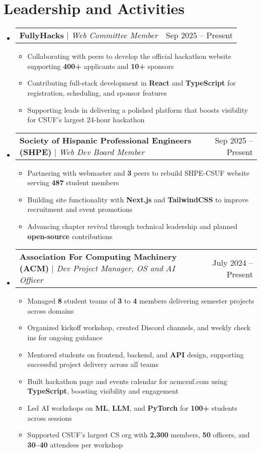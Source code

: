 \documentclass[letterpaper,11pt]{article}
\makeatletter
\newcommand{\resumeItem}[1]{
  \item\small{
    {#1 \vspace{-2pt}}
  }
}
\newcommand{\resumeProjectHeading}[2]{
    \item
    \begin{tabular*}{0.97\textwidth}{l@{\extracolsep{\fill}}r}
      \small#1 & #2 \\
    \end{tabular*}\vspace{-7pt}
}
\newcommand{\resumeSubHeadingListStart}{\begin{itemize}[leftmargin=0.15in, label={}]}
\newcommand{\resumeSubHeadingListEnd}{\end{itemize}}
\newcommand{\resumeItemListStart}{\begin{itemize}}
\newcommand{\resumeItemListEnd}{\end{itemize}\vspace{-5pt}}
\makeatother
\begin{document}
\section{Leadership and Activities}
    \resumeSubHeadingListStart
        \resumeProjectHeading
          {\textbf{FullyHacks} $|$ \emph{Web Committee Member}}{Sep 2025 -- Present}
          \resumeItemListStart
            \resumeItem{Collaborating with peers to develop the official hackathon website supporting \textbf{400+} applicants and \textbf{10+} sponsors}
            \resumeItem{Contributing full-stack development in \textbf{React} and \textbf{TypeScript} for registration, scheduling, and sponsor features}
            \resumeItem{Supporting leads in delivering a polished platform that boosts visibility for CSUF’s largest 24-hour hackathon}
          \resumeItemListEnd
    \resumeProjectHeading
          {\textbf{Society of Hispanic Professional Engineers (SHPE)} $|$ \emph{Web Dev Board Member}}{Sep 2025 -- Present}
          \resumeItemListStart
            \resumeItem{Partnering with webmaster and \textbf{3} peers to rebuild SHPE-CSUF website serving \textbf{487} student members}
            \resumeItem{Building site functionality with \textbf{Next.js} and \textbf{TailwindCSS} to improve recruitment and event promotions}
            \resumeItem{Advancing chapter revival through technical leadership and planned \textbf{open-source} contributions}
          \resumeItemListEnd
          \resumeProjectHeading
          {\textbf{Association For Computing Machinery (ACM)} $|$ \emph{Dev Project Manager, OS and AI Officer}}{July 2024 -- Present}
          \resumeItemListStart
            \resumeItem{Managed \textbf{8} student teams of \textbf{3} to \textbf{4} members delivering semester projects across domains}
            \resumeItem{Organized kickoff workshop, created Discord channels, and weekly check ins for ongoing guidance}
            \resumeItem{Mentored students on frontend, backend, and \textbf{API} design, supporting successful project delivery across all teams}
            \resumeItem{Built hackathon page and events calendar for acmcsuf.com using \textbf{TypeScript}, boosting visibility and engagement}
            \resumeItem{Led AI workshops on \textbf{ML}, \textbf{LLM}, and \textbf{PyTorch} for \textbf{100+} students across sessions}
            \resumeItem{Supported CSUF’s largest CS org with \textbf{2,300} members, \textbf{50} officers, and \textbf{30–40} attendees per workshop}
          \resumeItemListEnd
    \resumeSubHeadingListEnd



%

\end{document}
